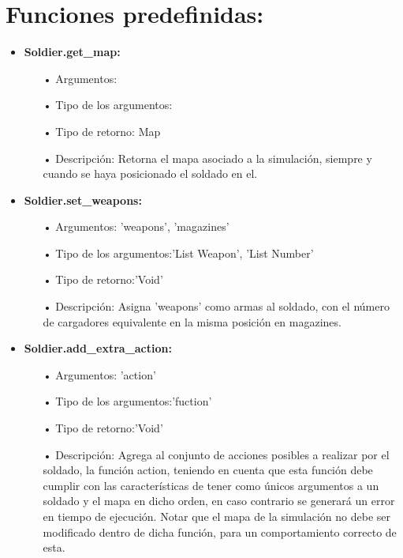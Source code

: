 \documentclass[twoside]{article}
\begin{document}
		\section{Funciones predefinidas:}
		\begin{itemize}
			\item \textbf{Soldier.get\_map:}
			\begin{itemize}
				\item[•]Argumentos: \\ 
				\item[•] Tipo de los argumentos:\\
				\item[•] Tipo de retorno: Map\\
				\item[•] Descripci\'on: Retorna el mapa asociado a la simulaci\'on, siempre y cuando se haya posicionado el soldado en el.
			\end{itemize}\vspace{0.2cm}
			
			
			\item \textbf{Soldier.set\_weapons:\\}
			\begin{itemize}
				\item[•] Argumentos: 'weapons', 'magazines' \\ 
				\item[•] Tipo de los argumentos:'List Weapon', 'List Number'\\
				\item[•] Tipo de retorno:'Void'\\
				\item[•] Descripci\'on: Asigna 'weapons' como armas al soldado, con el n\'umero de cargadores equivalente en la misma posici\'on en magazines.
			\end{itemize}\vspace{0.2cm}
			
			\item \textbf{Soldier.add\_extra\_action:\\}
			\begin{itemize}
				\item[•] Argumentos: 'action'\\
				\item[•] Tipo de los argumentos:'fuction' \\ 
				\item[•] Tipo de retorno:'Void'\\
				\item[•] Descripci\'on: Agrega al conjunto de acciones posibles a realizar por el soldado, la funci\'on action, teniendo en cuenta que esta funci\'on debe cumplir con las caracter\'isticas de tener como \'unicos argumentos a un soldado y el mapa en dicho orden, en caso contrario se generar\'a un error en tiempo de ejecuci\'on. Notar que el mapa de la simulaci\'on no debe ser modificado dentro de dicha funci\'on, para un comportamiento correcto de esta.
			\end{itemize}\vspace{0.2cm}
			

\end{itemize}
\end{document}
